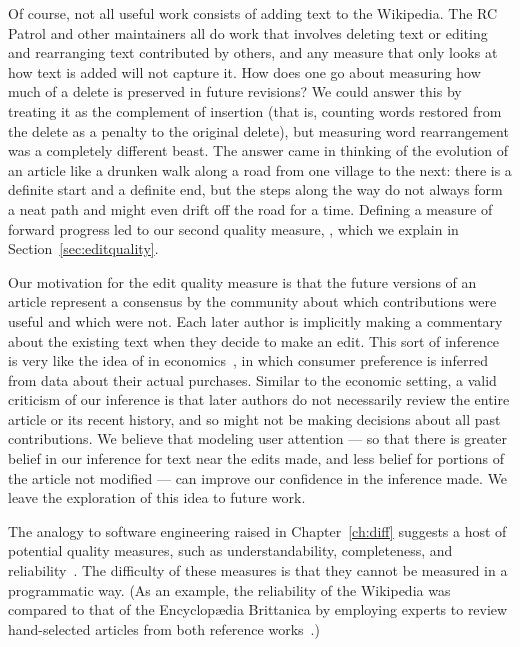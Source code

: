 Of course, not all useful work consists of adding text to the Wikipedia.
The RC Patrol and other maintainers all do work that involves
deleting text or editing and rearranging text contributed by others,
and any measure that only looks at how text is added will not capture it.
How does one go about measuring how much of a delete is preserved
in future revisions?
We could answer this by treating it as the complement of insertion
(that is, counting words restored from the delete as a
penalty to the original delete), but measuring word rearrangement
was a completely different beast.
The answer came in thinking of the evolution of an article
like a drunken walk along a road from one village to the next:
there is a definite start and a definite end, but the steps along the way
do not always form a neat path and might even drift off the road for a time.
Defining a measure of forward progress led to our second
quality measure, , which we explain in
Section~\ref{sec:editquality}.

Our motivation for the edit quality measure is that the future
versions of an article represent a consensus by the community about
which contributions were useful and which were not.
Each later author is implicitly making a commentary about the
existing text when they decide to make an edit.
This sort of inference is very like the idea of
 in economics~\cite{Samuelson1938,Varian2006},
in which consumer preference is inferred from data about their
actual purchases.
Similar to the economic setting, a valid criticism of our inference
is that later authors do not necessarily review the entire article
or its recent history, and so might not be making decisions about
all past contributions.
We believe that modeling user attention --- so that there is greater
belief in our inference for text near the edits made, and less belief
for portions of the article not modified ---
can improve our confidence in the inference made.
We leave the exploration of this idea to future work.

The analogy to software engineering raised in Chapter~\ref{ch:diff}
suggests a host of potential quality measures, such as
understandability, completeness, and reliability~\cite{wiki:SoftwareQuality}.
The difficulty of these measures is that they cannot be measured
in a programmatic way.
(As an example, the reliability of the Wikipedia was compared to that
of the Encyclop{\ae}dia Brittanica by employing experts to review
hand-selected articles from both reference works~\cite{Giles2005}.)

